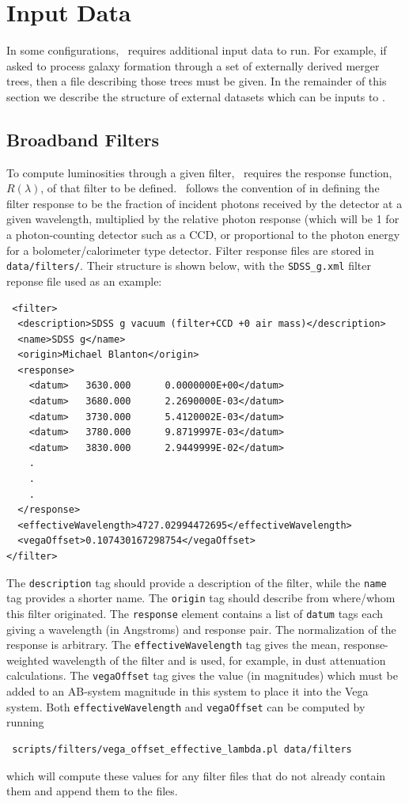 \chapter{Input Data}

In some configurations, \glc\ requires additional input data to run. For example, if asked to process galaxy formation through a set of externally derived merger trees, then a file describing those trees must be given. In the remainder of this section we describe the structure of external datasets which can be inputs to \glc.

\section{Broadband Filters}

To compute luminosities through a given filter, \glc\ requires the response function, $R(\lambda)$, of that filter to be defined. \glc\ follows the convention of \cite{hogg_k_2002} in defining the filter response to be the fraction of incident photons received by the detector at a given wavelength, multiplied by the relative photon response (which will be 1 for a photon-counting detector such as a CCD, or proportional to the photon energy for a bolometer/calorimeter type detector. Filter response files are stored in {\tt data/filters/}. Their structure is shown below, with the {\tt SDSS\_g.xml} filter reponse file used as an example:
\begin{verbatim}
 <filter>
  <description>SDSS g vacuum (filter+CCD +0 air mass)</description>
  <name>SDSS g</name>
  <origin>Michael Blanton</origin>
  <response>
    <datum>   3630.000      0.0000000E+00</datum>
    <datum>   3680.000      2.2690000E-03</datum>
    <datum>   3730.000      5.4120002E-03</datum>
    <datum>   3780.000      9.8719997E-03</datum>
    <datum>   3830.000      2.9449999E-02</datum>
    .
    .
    . 
  </response>
  <effectiveWavelength>4727.02994472695</effectiveWavelength>
  <vegaOffset>0.107430167298754</vegaOffset>
</filter>
\end{verbatim}
The {\tt description} tag should provide a description of the filter, while the {\tt name} tag provides a shorter name. The {\tt origin} tag should describe from where/whom this filter originated. The {\tt response} element contains a list of {\tt datum} tags each giving a wavelength (in Angstroms) and response pair. The normalization of the response is arbitrary. The {\tt effectiveWavelength} tag gives the mean, response-weighted wavelength of the filter and is used, for example, in dust attenuation calculations. The {\tt vegaOffset} tag gives the value (in magnitudes) which must be added to an AB-system magnitude in this system to place it into the Vega system. Both {\tt effectiveWavelength} and {\tt vegaOffset} can be computed by running
\begin{verbatim}
 scripts/filters/vega_offset_effective_lambda.pl data/filters
\end{verbatim}
which will compute these values for any filter files that do not already contain them and append them to the files.


